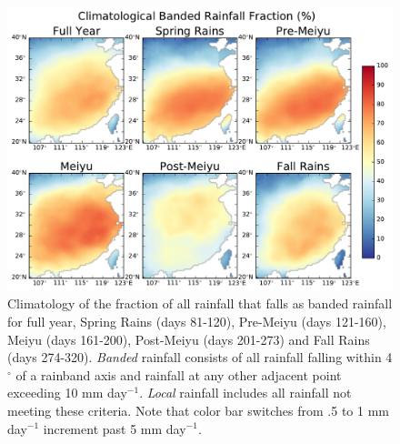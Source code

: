 \documentclass[singlecolumn,11pt]{pnas-new}
\begin{document}
\begin{figure}[htb]
\centering
\noindent\includegraphics[width=38pc]{Figures/banded_frac_climo}
\caption{Climatology of the fraction of all rainfall that falls as banded rainfall for full year, Spring Rains (days 81-120), Pre-Meiyu (days 121-160), Meiyu (days 161-200), Post-Meiyu (days 201-273) and Fall Rains (days 274-320). \textit{Banded} rainfall consists of all rainfall falling within 4$^{\circ}$ of a rainband axis and rainfall at any other adjacent point exceeding 10 mm day$^{-1}$. \textit{Local} rainfall includes all rainfall not meeting these criteria. Note that color bar switches from .5 to 1 mm day$^{-1}$ increment past 5 mm day$^{-1}$.}
\label{fig:banded_frac_climo}
\end{figure}
\end{document}
